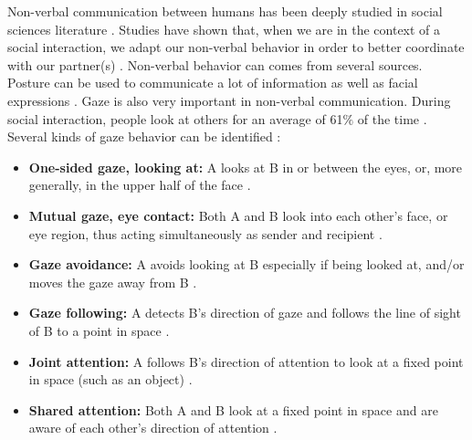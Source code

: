 \documentclass[english,a4paper,11pt,twoside]{StyleThese}
\begin{document}
Non-verbal communication between humans has been deeply studied in social sciences literature \cite{ekman1969repertoire, depaulo1992nonverbal}. Studies have shown that, when we are in the context of a social interaction, we adapt our non-verbal behavior in order to better coordinate with our partner(s) \cite{becchio2010toward, vesper2010minimal}. Non-verbal behavior can comes from several sources. Posture can be used to communicate a lot of information \cite{mehrabian1969significance} as well as facial expressions \cite{labarre1947cultural}. Gaze is also very important in non-verbal communication. During social interaction, people look at others for an average of 61$\%$ of the time \cite{argyle1972gaze}. Several kinds of gaze behavior can be identified \cite{mutlu2009designing}:
\begin{itemize}
\item \textbf{One-sided gaze, looking at:} A looks at B
in or between the eyes, or, more generally, in the upper half of the face \cite{cook1977gaze}.
\item \textbf{Mutual gaze, eye contact:} Both A and B look into each other’s face, or eye region, thus acting simultaneously as sender and recipient \cite{von1973perception}.
\item \textbf{ Gaze avoidance:} A avoids looking at B especially
if being looked at, and/or moves the gaze away from B \cite{von1973perception, emery2000eyes}.
\item \textbf{Gaze following:} A detects B’s direction of gaze and follows the line of sight of B to a point in space \cite{emery2000eyes}.
\item \textbf{Joint attention:} A follows B’s direction of attention
to look at a fixed point in space (such as an object) \cite{butterworth1991ontogeny}.
\item \textbf{Shared attention:} Both A and B look at a fixed point in space and are aware of each other’s direction of attention \cite{baron1995eye, emery2000eyes}.
\end{itemize}
\end{document}
